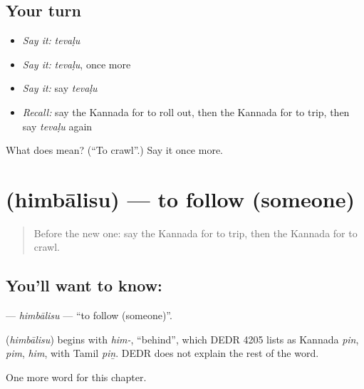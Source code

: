 \subsection*{Your turn}
\begin{itemize}
\raggedright
  \item \emph{Say it:} \emph{tevaḷu}
  \item \emph{Say it:} \emph{tevaḷu}, once more
  \item \emph{Say it:} say \emph{tevaḷu}
  \item \emph{Recall:} say the Kannada for to roll out, then the Kannada for to trip, then say \emph{tevaḷu} again
\end{itemize}

\begin{tcolorbox}[breakable,colback=teal!4,colframe=teal!35!black,title={Before you move on}]
What does  mean? (\textquotedblleft{}To crawl\textquotedblright{}.) Say it once more.
\end{tcolorbox}
\section[\texorpdfstring{\kn{ಹಿಂಬಾಲಿಸು} (himbālisu)}{ಹಿಂಬಾಲಿಸು (himbālisu)}]{ (himbālisu) — to follow (someone)}

\label{lesson:KA-C206-himbalisu}



\begin{quote}
Before the new one: say the Kannada for to trip, then the Kannada for to crawl.
\end{quote}

\subsection*{You'll want to know: }
\textbf{} — \emph{himbālisu} — \textquotedblleft{}to follow (someone)\textquotedblright{}.

\begin{cousinweb}
\textbf{} (\emph{himbālisu}) begins with \emph{him-}, \textquotedblleft{}behind\textquotedblright{}, which DEDR 4205 lists as Kannada \emph{pin}, \emph{pim}, \emph{him}, with Tamil \emph{piṉ}. DEDR does not explain the rest of the word.
\end{cousinweb}

\begin{grammarlens}[title={What you've built}]
One more word for this chapter.
\end{grammarlens}

